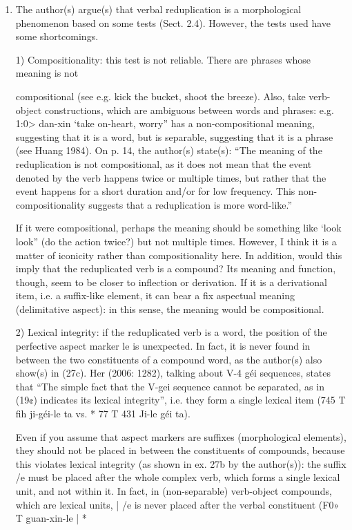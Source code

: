 \documentclass[fleqn,twoside]{article}
\begin{document}
\begin{enumerate}
\item
The author(s) argue(s) that verbal reduplication is a morphological phenomenon based on some tests (Sect. 2.4). However, the tests used have some shortcomings.

1) Compositionality: this test is not reliable. There are phrases whose meaning is not

compositional (see e.g. kick the bucket, shoot the breeze). Also, take verb-object constructions,
which are ambiguous between words and phrases: e.g. 1:0> dan-xin ‘take on-heart, worry” has a
non-compositional meaning, suggesting that it is a word, but is separable, suggesting that it is a
phrase (see Huang 1984). On p. 14, the author(s) state(s): “The meaning of the reduplication is not
compositional, as it does not mean that the event denoted by the verb happens twice or multiple
times, but rather that the event happens for a short duration and/or for low frequency. This non-
compositionality suggests that a reduplication is more word-like.”

If it were compositional, perhaps the meaning should be something like ‘look look” (do the action twice?) but not multiple times. However, I think it is a matter of iconicity rather than compositionality here. In addition, would this imply that the reduplicated verb is a compound? Its meaning and function, though, seem to be closer to inflection or derivation. If it is a derivational item, i.e. a suffix-like element, it can bear a fix aspectual meaning (delimitative aspect): in this sense, the meaning would be compositional.

2) Lexical integrity: if the reduplicated verb is a word, the position of the perfective aspect
marker le is unexpected. In fact, it is never found in between the two constituents of a compound
word, as the author(s) also show(s) in (27c). Her (2006: 1282), talking about V-4 géi sequences,
states that “The simple fact that the V-gei sequence cannot be separated, as in (19¢) indicates its
lexical integrity”, i.e. they form a single lexical item (745 T fih ji-géi-le ta vs. * 77 T 431 Ji-le géi ta).


Even if you assume that aspect markers are suffixes (morphological elements), they should not be placed in between the constituents of compounds, because this violates lexical integrity (as shown in ex. 27b by the author(s)): the suffix /e must be placed after the whole complex verb, which forms a single lexical unit, and not within it. In fact, in (non-separable) verb-object compounds, which are lexical units, | /e is never placed after the verbal constituent (F0» T guan-xin-le | *%


\end{enumerate}
\end{document}
